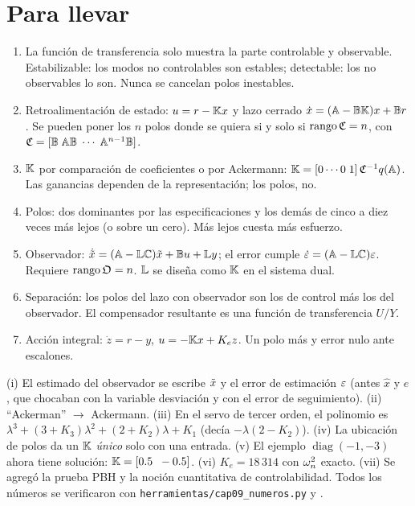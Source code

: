 \section{Para llevar}
\label{sec:re-cierre}

\begin{parallevar}
\begin{enumerate}
  \item La función de transferencia solo muestra la parte controlable y observable. Estabilizable: los modos no controlables son estables; detectable: los no observables lo son. Nunca se cancelan polos inestables.
  \item Retroalimentación de estado: $u=r-\mathbb{K} x$ y lazo cerrado $\dot x=(\mathbb{A}-\mathbb{B}\mathbb{K})x+\mathbb{B} r$. Se pueden poner los $n$ polos donde se quiera si y solo si $\operatorname{rango}\mathfrak{C}=n$, con $\mathfrak{C}=[\mathbb{B}\;\mathbb{A}\mathbb{B}\;\cdots\;\mathbb{A}^{n-1}\mathbb{B}]$.
  \item $\mathbb{K}$ por comparación de coeficientes o por Ackermann: $\mathbb{K}=[0\cdots0\;1]\,\mathfrak{C}^{-1}q(\mathbb{A})$. Las ganancias dependen de la representación; los polos, no.
  \item Polos: dos dominantes por las especificaciones y los demás de cinco a diez veces más lejos (o sobre un cero). Más lejos cuesta más esfuerzo.
  \item Observador: $\dot{\tilde{x}}=(\mathbb{A}-\mathbb{L}\mathbb{C})\tilde{x}+\mathbb{B} u+\mathbb{L} y$; el error cumple $\dot{\varepsilon}=(\mathbb{A}-\mathbb{L}\mathbb{C})\varepsilon$. Requiere $\operatorname{rango}\mathfrak{O}=n$. $\mathbb{L}$ se diseña como $\mathbb{K}$ en el sistema dual.
  \item Separación: los polos del lazo con observador son los de control más los del observador. El compensador resultante es una función de transferencia $U/Y$.
  \item Acción integral: $\dot z=r-y$, $u=-\mathbb{K} x+K_ez$. Un polo más y error nulo ante escalones.
\end{enumerate}
\end{parallevar}

\begin{profundiza}
(i) El estimado del observador se escribe $\tilde{x}$ y el error de estimación $\varepsilon$ (antes $\hat{x}$ y $e$, que chocaban con la variable desviación y con el error de seguimiento). (ii) ``Ackerman'' $\to$ Ackermann. (iii) En el servo de tercer orden, el polinomio es $\lambda^3+(3+K_3)\lambda^2+(2+K_2)\lambda+K_1$ (decía $-\lambda(2-K_2)$). (iv) La ubicación de polos da un $\mathbb{K}$ \emph{único} solo con una entrada. (v) El ejemplo $\operatorname{diag}(-1,-3)$ ahora tiene solución: $\mathbb{K}=[0.5\;\;-0.5]$. (vi) $K_e=18\,314$ con $\omega_n^2$ exacto. (vii) Se agregó la prueba PBH y la noción cuantitativa de controlabilidad. Todos los números se verificaron con \texttt{herramientas/cap09\_numeros.py} y .
\end{profundiza}

